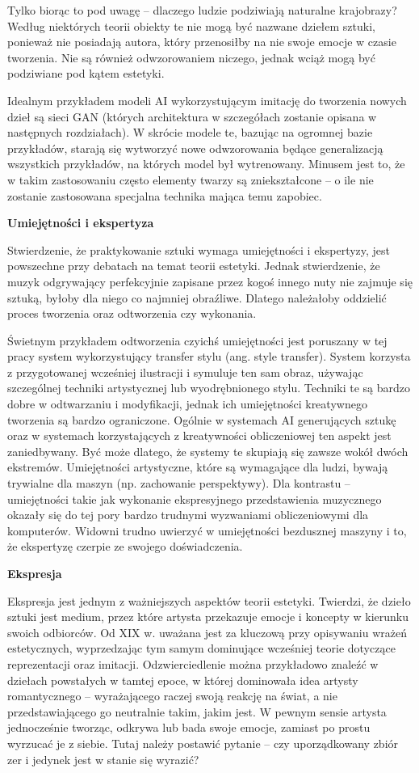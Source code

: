 \documentclass[12pt]{article}
\begin{document}
Tylko biorąc to pod uwagę – dlaczego ludzie podziwiają naturalne krajobrazy? Według niektórych teorii obiekty te nie mogą być nazwane dziełem sztuki, ponieważ nie posiadają autora, który przenosiłby na nie swoje emocje w czasie tworzenia. Nie są również odwzorowaniem niczego, jednak wciąż mogą być podziwiane pod kątem estetyki.

Idealnym przykładem modeli AI wykorzystującym imitację do tworzenia nowych dzieł są sieci GAN (których architektura w szczegółach zostanie opisana w następnych rozdziałach). W skrócie modele te, bazując na ogromnej bazie przykładów, starają się wytworzyć nowe odwzorowania będące generalizacją wszystkich przykładów, na których model był wytrenowany. Minusem jest to, że w takim zastosowaniu często elementy twarzy są zniekształcone – o ile nie zostanie zastosowana specjalna technika mająca temu zapobiec.

\noindent\textbf{Umiejętności i ekspertyza}

Stwierdzenie, że praktykowanie sztuki wymaga umiejętności i ekspertyzy, jest powszechne przy debatach na temat teorii estetyki. Jednak stwierdzenie, że muzyk odgrywający perfekcyjnie zapisane przez kogoś innego nuty nie zajmuje się sztuką, byłoby dla niego co najmniej obraźliwe. Dlatego należałoby oddzielić proces tworzenia oraz odtworzenia czy wykonania.

Świetnym przykładem odtworzenia czyichś umiejętności jest poruszany w tej pracy system wykorzystujący transfer stylu (ang. style transfer). System korzysta z przygotowanej wcześniej ilustracji i symuluje ten sam obraz, używając szczególnej techniki artystycznej lub wyodrębnionego stylu. Techniki te są bardzo dobre w odtwarzaniu i modyfikacji, jednak ich umiejętności kreatywnego tworzenia są bardzo ograniczone. Ogólnie w systemach AI generujących sztukę oraz w systemach korzystających z kreatywności obliczeniowej ten aspekt jest zaniedbywany. Być może dlatego, że systemy te skupiają się zawsze wokół dwóch ekstremów. Umiejętności artystyczne, które są wymagające dla ludzi, bywają trywialne dla maszyn (np. zachowanie perspektywy). Dla kontrastu – umiejętności takie jak wykonanie ekspresyjnego przedstawienia muzycznego okazały się do tej pory bardzo trudnymi wyzwaniami obliczeniowymi dla komputerów. Widowni trudno uwierzyć w umiejętności bezdusznej maszyny i to, że ekspertyzę czerpie ze swojego doświadczenia.

\noindent\textbf{Ekspresja}

Ekspresja jest jednym z ważniejszych aspektów teorii estetyki. Twierdzi, że dzieło sztuki jest medium, przez które artysta przekazuje emocje i koncepty w kierunku swoich odbiorców. Od XIX w. uważana jest za kluczową przy opisywaniu wrażeń estetycznych, wyprzedzając tym samym dominujące wcześniej teorie dotyczące reprezentacji oraz imitacji. Odzwierciedlenie można przykładowo znaleźć w dziełach powstałych w tamtej epoce, w której dominowała idea artysty romantycznego – wyrażającego raczej swoją reakcję na świat, a nie przedstawiającego go neutralnie takim, jakim jest. W pewnym sensie artysta jednocześnie tworząc, odkrywa lub bada swoje emocje, zamiast po prostu wyrzucać je z siebie. Tutaj należy postawić pytanie – czy uporządkowany zbiór zer i jedynek jest w stanie się wyrazić?
\end{document}
